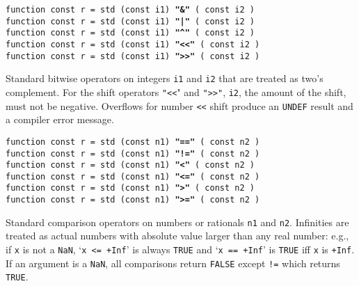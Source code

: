 \documentclass[12pt]{article}
\newcommand{\ttkey}[1]{{\tt \bfseries #1}}
\newenvironment{indpar}[1][0.3in]%
	{\begin{list}{}%
		     {\setlength{\itemsep}{0in}%
		      \setlength{\topsep}{0in}%
		      \setlength{\parsep}{1ex}%
		      \setlength{\labelwidth}{#1}%
		      \setlength{\leftmargin}{#1}%
		      \addtolength{\leftmargin}{\labelsep}}%
	 \item}%
	{\end{list}}
\begin{document}
{\tt function const r = std (const i1) \ttkey{"\&"} ( const i2 )} \\
{\tt function const r = std (const i1) \ttkey{"|"} ( const i2 )} \\
{\tt function const r = std (const i1) \ttkey{"\textasciicircum"}
                            ( const i2 )} \\
{\tt function const r = std (const i1) \ttkey{"<{}<"} ( const i2 )} \\
{\tt function const r = std (const i1) \ttkey{">{}>"} ( const i2 )}
\begin{indpar}
Standard bitwise operators on integers {\tt i1} and {\tt i2}
that are treated as two's complement.  For the shift operators
{\tt "<{}<}" and {\tt ">{}>"}, {\tt i2}, the amount of the shift,
must not be negative.  Overflows for number {\tt <{}<} shift
produce an {\tt UNDEF} result and a compiler error message.
\end{indpar}

{\tt function const r = std (const n1) \ttkey{"=="} ( const n2 )} \\
{\tt function const r = std (const n1) \ttkey{"!="} ( const n2 )} \\
{\tt function const r = std (const n1) \ttkey{"<"} ( const n2 )} \\
{\tt function const r = std (const n1) \ttkey{"<="} ( const n2 )} \\
{\tt function const r = std (const n1) \ttkey{">"} ( const n2 )} \\
{\tt function const r = std (const n1) \ttkey{">="} ( const n2 )}
\begin{indpar}
Standard comparison operators on numbers or rationals {\tt n1} and {\tt n2}.
Infinities are treated as actual numbers with absolute value
larger than any real number: e.g., if {\tt x} is not a {\tt NaN},
`{\tt x <= +Inf}' is always
{\tt TRUE} and `{\tt x == +Inf}' is {\tt TRUE} iff {\tt x} is {\tt +Inf}.
If an argument is a {\tt NaN}, all comparisons return {\tt FALSE}
except {\tt !=} which returns {\tt TRUE}.
\end{indpar}
\end{document}
